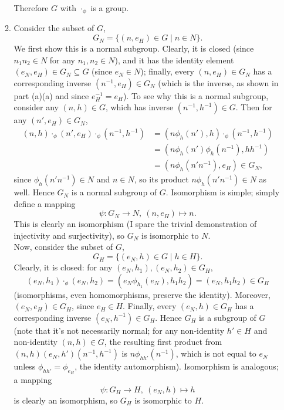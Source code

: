 \documentclass{homework}
\begin{document}
\begin{solution}
\begin{enumerate}[label=(\alph*)]
\begin{enumerate}
        Therefore $G$ with $\cdot _\phi$ is a group.
      \item Consider the subset of $G$, \[
          G_N = \{(n,e_H)\in G\mid n\in N\} 
        .\] We first show this is a normal subgroup. Clearly, it is closed (since $n_1n_2\in N$ for
        any $n_1,n_2\in N$), and it has the identity element $(e_N,e_H)\in G_N\subseteq G$ (since
        $e_N\in N$); finally, every $(n,e_H)\in G_N$ has a corresponding inverse $(n^{-1},e_H)\in
        G_N$ (which is the inverse, as shown in part (a)(a) and since $e_H^{-1}=e_H$). To see why
        this is a normal subgroup, consider any $(n,h)\in G$, which has inverse $(n^{-1},h^{-1})\in
        G$. Then for any $(n',e_H)\in G_N$,
        \begin{align*}
          (n,h)\cdot_\phi(n',e_H)\cdot_\phi(n^{-1},h^{-1})&= (n\phi_h(n'),h)\cdot_\phi
          (n^{-1},h^{-1})\\
                                                          &= (n\phi_h(n')\phi_h(n^{-1}),hh^{-1}) \\
                                                          &= (n\phi_h(n'n^{-1}),e_H)\in G_N
        ,\end{align*}
        since $\phi_h(n'n^{-1})\in N$ and $n\in N$, so its product $n\phi_h(n'n^{-1})\in N$ as
        well. Hence $G_N$ is a normal subgroup of $G$. Isomorphism is simple; simply define a
        mapping \[
          \psi:G_N\longrightarrow N,\ (n,e_H)\longmapsto n
        .\] This is clearly an isomorphism (I spare the trivial demonstration of injectivity and
        surjectivity), so $G_N$ is isomorphic to $N$.\\

        Now, consider the subset of $G$, \[
          G_H = \{(e_N,h)\in G\mid h\in H\} 
        .\] Clearly, it is closed: for any $(e_N,h_1),(e_N,h_2)\in G_H$, \[
          (e_N,h_1)\cdot _\phi(e_N,h_2)=(e_N\phi_{h_1}(e_N), h_1h_2)=(e_N,h_1h_2)\in G_H
        \] (isomorphisms, even homomorphisms, preserve the identity). Moreover, $(e_N,e_H)\in G_H$,
        since $e_H\in H$. Finally, every $(e_N,h)\in G_H$ has a corresponding inverse
        $(e_N,h^{-1})\in G_H$. Hence $G_H$ is a subgroup of $G$ (note that it's not necessarily
        normal; for any non-identity $h'\in H$ and non-identity $(n,h)\in G$, the resulting first
        product from $(n,h)(e_N,h')(n^{-1},h^{-1})$ is $n\phi_{hh'}(n^{-1})$, which is not equal to
        $e_N$ unless $\phi_{hh'}=\phi_{e_H}$, the identity automorphism). Isomorphism is analogous;
        a mapping \[
          \psi:G_H\longrightarrow H,\ (e_N,h)\longmapsto h
        \] is clearly an isomorphism, so $G_H$ is isomorphic to $H$.
      \end{enumerate}


\end{enumerate}
\end{solution}
\end{document}
